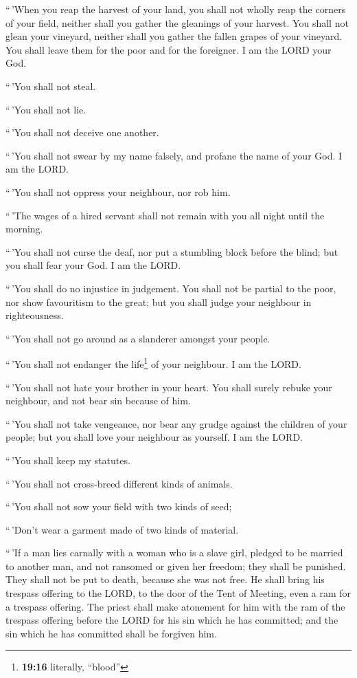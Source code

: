  ``\,'When you reap the harvest of your land, you shall
not wholly reap the corners of your field, neither shall you gather the
gleanings of your harvest.  You shall not glean your
vineyard, neither shall you gather the fallen grapes of your vineyard.
You shall leave them for the poor and for the foreigner. I am the LORD
your God.

 ``\,'You shall not steal.

``\,'You shall not lie.

``\,'You shall not deceive one another.

 ``\,'You shall not swear by my name falsely, and profane
the name of your God. I am the LORD.

 ``\,'You shall not oppress your neighbour, nor rob him.

``\,'The wages of a hired servant shall not remain with you all night
until the morning.

 ``\,'You shall not curse the deaf, nor put a stumbling
block before the blind; but you shall fear your God. I am the LORD.

 ``\,'You shall do no injustice in judgement. You shall
not be partial to the poor, nor show favouritism to the great; but you
shall judge your neighbour in righteousness.

 ``\,'You shall not go around as a slanderer amongst your
people.

``\,'You shall not endanger the life\footnote{\textbf{19:16} literally,
  ``blood''} of your neighbour. I am the LORD.

 ``\,'You shall not hate your brother in your heart. You
shall surely rebuke your neighbour, and not bear sin because of him.

 ``\,'You shall not take vengeance, nor bear any grudge
against the children of your people; but you shall love your neighbour
as yourself. I am the LORD.

 ``\,'You shall keep my statutes.

``\,'You shall not cross-breed different kinds of animals.

``\,'You shall not sow your field with two kinds of seed;

``\,'Don't wear a garment made of two kinds of material.

 ``\,'If a man lies carnally with a woman who is a slave
girl, pledged to be married to another man, and not ransomed or given
her freedom; they shall be punished. They shall not be put to death,
because she was not free.  He shall bring his trespass
offering to the LORD, to the door of the Tent of Meeting, even a ram for
a trespass offering.  The priest shall make atonement for
him with the ram of the trespass offering before the LORD for his sin
which he has committed; and the sin which he has committed shall be
forgiven him.

